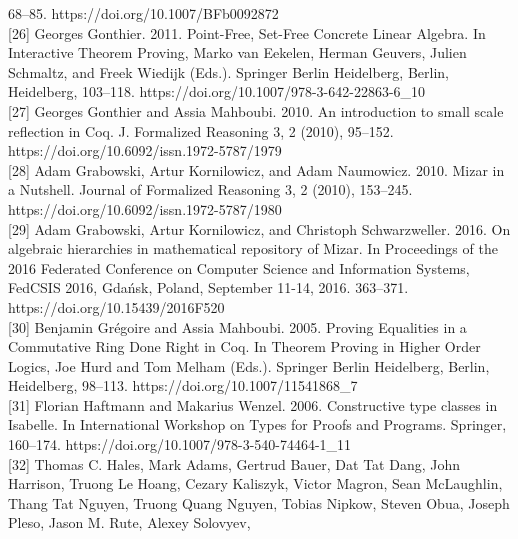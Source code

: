 \documentclass[
]{article}
\begin{document}
68--85. https://doi.org/10.1007/BFb0092872\\
{[}26{]} Georges Gonthier. 2011. Point-Free, Set-Free Concrete Linear
Algebra. In Interactive Theorem Proving, Marko van Eekelen, Herman
Geuvers, Julien Schmaltz, and Freek Wiedijk (Eds.). Springer Berlin
Heidelberg, Berlin, Heidelberg, 103--118.
https://doi.org/10.1007/978-3-642-22863-6\_10\\
{[}27{]} Georges Gonthier and Assia Mahboubi. 2010. An introduction to
small scale reflection in Coq. J. Formalized Reasoning 3, 2 (2010),
95--152. https://doi.org/10.6092/issn.1972-5787/1979\\
{[}28{]} Adam Grabowski, Artur Kornilowicz, and Adam Naumowicz. 2010.
Mizar in a Nutshell. Journal of Formalized Reasoning 3, 2 (2010),
153--245. https://doi.org/10.6092/issn.1972-5787/1980\\
{[}29{]} Adam Grabowski, Artur Kornilowicz, and Christoph Schwarzweller.
2016. On algebraic hierarchies in mathematical repository of Mizar. In
Proceedings of the 2016 Federated Conference on Computer Science and
Information Systems, FedCSIS 2016, Gdańsk, Poland, September 11-14,
2016. 363--371. https://doi.org/10.15439/2016F520\\
{[}30{]} Benjamin Grégoire and Assia Mahboubi. 2005. Proving Equalities
in a Commutative Ring Done Right in Coq. In Theorem Proving in Higher
Order Logics, Joe Hurd and Tom Melham (Eds.). Springer Berlin
Heidelberg, Berlin, Heidelberg, 98--113.
https://doi.org/10.1007/11541868\_7\\
{[}31{]} Florian Haftmann and Makarius Wenzel. 2006. Constructive type
classes in Isabelle. In International Workshop on Types for Proofs and
Programs. Springer, 160--174.
https://doi.org/10.1007/978-3-540-74464-1\_11\\
{[}32{]} Thomas C. Hales, Mark Adams, Gertrud Bauer, Dat Tat Dang, John
Harrison, Truong Le Hoang, Cezary Kaliszyk, Victor Magron, Sean
McLaughlin, Thang Tat Nguyen, Truong Quang Nguyen, Tobias Nipkow, Steven
Obua, Joseph Pleso, Jason M. Rute, Alexey Solovyev,
\end{document}
